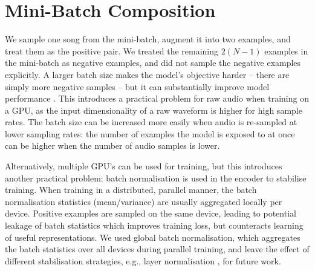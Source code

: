 \section{Mini-Batch Composition} %
We sample one song from the mini-batch, augment it into two examples, and treat them as the positive pair. We treated the remaining $2(N-1)$ examples in the mini-batch as negative examples, and did not sample the negative examples explicitly. A larger batch size makes the model's objective harder -- there are simply more negative samples -- but it can substantially improve model performance \cite{chen_simple_2020}. This introduces a practical problem for raw audio when training on a GPU, as the input dimensionality of a raw waveform is higher for high sample rates. The batch size can be increased more easily when audio is re-sampled at lower sampling rates: the number of examples the model is exposed to at once can be higher when the number of audio samples is lower.

Alternatively, multiple GPU's can be used for training, but this introduces another practical problem: batch normalisation \cite{batch_normalisation} is used in the encoder to stabilise training. When training in a distributed, parallel manner, the batch normalisation statistics (mean/variance) are usually aggregated locally per device. Positive examples are sampled on the same device, leading to potential leakage of batch statistics which improves training loss, but counteracts learning of useful representations. We used global batch normalisation, which aggregates the batch statistics over all devices during parallel training, and leave the effect of different stabilisation strategies, e.g., layer normalisation \cite{henaff2019data}, for future work.


